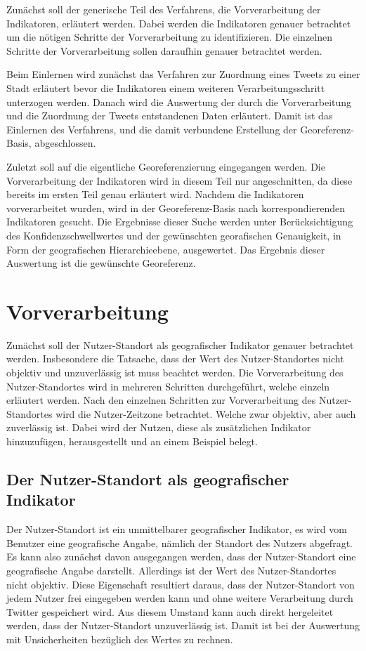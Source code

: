 	Zunächst soll der generische Teil des Verfahrens, die Vorverarbeitung der Indikatoren, erläutert werden.
	Dabei werden die Indikatoren genauer betrachtet um die nötigen Schritte der Vorverarbeitung zu identifizieren.   
	Die einzelnen Schritte der Vorverarbeitung sollen daraufhin genauer betrachtet werden.

	Beim Einlernen wird zunächst das Verfahren zur Zuordnung eines Tweets zu einer Stadt erläutert bevor die Indikatoren einem weiteren Verarbeitungsschritt unterzogen werden. 
	Danach wird die Auswertung der durch die Vorverarbeitung und die Zuordnung der Tweets entstandenen Daten erläutert.
	Damit ist das Einlernen des Verfahrens, und die damit verbundene Erstellung der Georeferenz-Basis, abgeschlossen.

	Zuletzt soll auf die eigentliche Georeferenzierung eingegangen werden.
	Die Vorverarbeitung der Indikatoren wird in diesem Teil nur angeschnitten, da diese bereits im ersten Teil genau erläutert wird. 
	Nachdem die Indikatoren vorverarbeitet wurden, wird in der Georeferenz-Basis nach korrespondierenden Indikatoren gesucht. 
	Die Ergebnisse dieser Suche werden unter Berücksichtigung des Konfidenzschwellwertes und der gewünschten georafischen Genauigkeit, in Form der geografischen Hierarchieebene, ausgewertet.
	Das Ergebnis dieser Auswertung ist die gewünschte Georeferenz. 


	\section{Vorverarbeitung}
	Zunächst soll der Nutzer-Standort als geografischer Indikator genauer betrachtet werden. 
	Insbesondere die Tatsache, dass der Wert des Nutzer-Standortes nicht objektiv und unzuverlässig ist muss beachtet werden. 
	Die Vorverarbeitung des Nutzer-Standortes wird in mehreren Schritten durchgeführt, welche einzeln erläutert werden.
	Nach den einzelnen Schritten zur Vorverarbeitung des Nutzer-Standortes wird die Nutzer-Zeitzone betrachtet.
	Welche zwar objektiv, aber auch zuverlässig ist. 
	Dabei wird der Nutzen, diese als zusätzlichen Indikator hinzuzufügen, herausgestellt und an einem Beispiel belegt.  

		\subsection{Der Nutzer-Standort als geografischer Indikator} 

		Der Nutzer-Standort ist ein unmittelbarer geografischer Indikator, es wird vom Benutzer eine geografische Angabe, nämlich der Standort des Nutzers abgefragt. 
		Es kann also zunächst davon ausgegangen werden, dass der Nutzer-Standort eine geografische Angabe darstellt.
		Allerdings ist der Wert des Nutzer-Standortes nicht objektiv.
		Diese Eigenschaft resultiert daraus, dass der Nutzer-Standort von jedem Nutzer frei eingegeben werden kann und ohne weitere Verarbeitung durch Twitter gespeichert wird. 
		Aus diesem Umstand kann auch direkt hergeleitet werden, dass der Nutzer-Standort unzuverlässig ist.
		Damit ist bei der Auswertung mit Unsicherheiten bezüglich des Wertes zu rechnen. 
		
